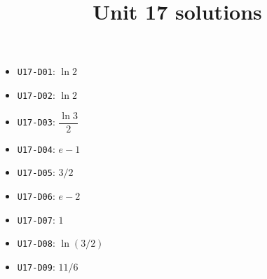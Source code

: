 
\title{Unit 17 solutions}

\maketitle
\begin{itemize}
  \item \texttt{U17-D01}: $\ln 2$
  \item \texttt{U17-D02}: $\ln 2$
  \item \texttt{U17-D03}: $\dfrac{\ln 3}{2}$
  \item \texttt{U17-D04}: $e-1$
  \item \texttt{U17-D05}: $3/2$
  \item \texttt{U17-D06}: $e-2$
  \item \texttt{U17-D07}: $1$
  \item \texttt{U17-D08}: $\ln(3/2)$
  \item \texttt{U17-D09}: $11/6$
\end{itemize}

